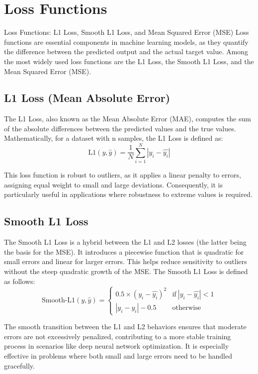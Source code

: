 \section{Loss Functions}
Loss Functions: L1 Loss, Smooth L1 Loss, and Mean Squared Error (MSE)
Loss functions are essential components in machine learning models, as they quantify the difference between the predicted output and the actual target value. Among the most widely used loss functions are the L1 Loss, the Smooth L1 Loss, and the Mean Squared Error (MSE).

\subsection{L1 Loss (Mean Absolute Error)}
The L1 Loss, also known as the Mean Absolute Error (MAE), computes the sum of the absolute differences between the predicted values and the true values.
Mathematically, for a dataset with n samples, the L1 Loss is defined as:
\begin{equation}
   \text{L1}(y, \hat{y}) = \frac{1}{N} \sum_{i=1}^{N} |y_i - \hat{y_i}|
\end{equation}

This loss function is robust to outliers, as it applies a linear penalty to errors, assigning equal weight to small and large deviations. Consequently, it is particularly useful in applications where robustness to extreme values is required. 

\subsection{Smooth L1 Loss}
The Smooth L1 Loss is a hybrid between the L1 and L2 losses (the latter being the basis for the MSE). It introduces a piecewise function that is quadratic for small errors and linear for larger errors. This helps reduce sensitivity to outliers without the steep quadratic growth of the MSE. The Smooth L1 Loss is defined as follows:
\begin{equation}
    \text{Smooth-L1}(y, \hat{y}) = 
    \begin{cases} 
        0.5 \times (y_i - \hat{y_i})^2 & \text{if} \ |y_i - \hat{y_i}| < 1 \\
        |y_i - \hat{y_i}| - 0.5 & \text{otherwise}
    \end{cases}
\end{equation}


 
The smooth transition between the L1 and L2 behaviors ensures that moderate errors are not excessively penalized, contributing to a more stable training process in scenarios like deep neural network optimization. It is especially effective in problems where both small and large errors need to be handled gracefully.

